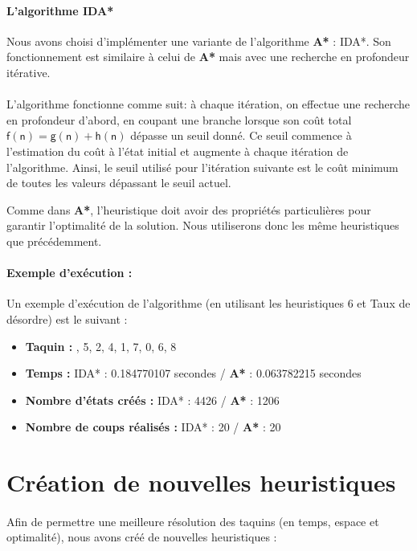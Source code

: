 \documentclass[10pt,a4paper]{report}
\begin{document}
\paragraph{L'algorithme IDA*}{Nous avons choisi d'implémenter une variante de l'algorithme \textbf{A*} : IDA*. Son fonctionnement est similaire à celui de \textbf{A*} mais avec une recherche en profondeur itérative.}
\paragraph{}{L'algorithme fonctionne comme suit: à chaque itération, on effectue une recherche en profondeur d'abord, en coupant une branche lorsque son coût total
$\mathsf{f(n) = g(n) + h(n)}$ dépasse un seuil donné. Ce seuil commence à l'estimation du coût à l'état initial et augmente à chaque itération de l'algorithme. Ainsi, le seuil utilisé pour l'itération suivante est le coût minimum de toutes les valeurs dépassant le seuil actuel.

Comme dans \textbf{A*}, l'heuristique doit avoir des propriétés particulières pour garantir l'optimalité de la solution. Nous utiliserons donc les même heuristiques que précédemment.}

\paragraph{Exemple d'exécution : }{Un exemple d'exécution de l'algorithme (en utilisant les heuristiques 6 et Taux de désordre) est le suivant : }
\begin{itemize}
\item \textbf{Taquin : } , 5, 2, 4, 1, 7, 0, 6, 8\rbrack
\item \textbf{Temps : }IDA* :  0.184770107 secondes / \textbf{A*} : 0.063782215 secondes
\item \textbf{Nombre d'états créés :} IDA* : 4426 / \textbf{A*} : 1206
\item \textbf{Nombre de coups réalisés : } IDA* : 20 / \textbf{A*} : 20
\end{itemize}

\section{Création de nouvelles heuristiques}
\paragraph{}{Afin de permettre une meilleure résolution des taquins (en temps, espace et optimalité), nous avons créé de nouvelles heuristiques : }
\end{document}
